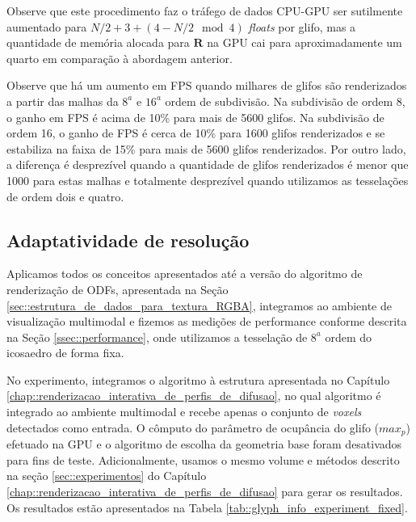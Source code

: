 \documentclass[
    12pt,                %
    oneside,            %
    a4paper,            %
    english,            %
    french,                %
    spanish,            %
    brazil                %
    ]{abntex2}
\begin{document}
Observe que este procedimento faz o tráfego de dados CPU-GPU ser sutilmente aumentado para $N/2 + 3 + (4 -N/2 \mod{4})$ \textit{floats} por glifo, mas a quantidade de memória alocada para $\mathbf{R}$ na GPU cai para aproximadamente um quarto em comparação à abordagem anterior.

Observe que há um aumento em FPS quando milhares de glifos são renderizados a partir das malhas da $8^a$ e $16^a$ ordem de subdivisão. Na subdivisão de ordem 8, o ganho em FPS é acima de 10\% para mais de 5600 glifos. Na subdivisão de ordem 16, o ganho de FPS é cerca de 10\% para 1600 glifos renderizados e se estabiliza na faixa de 15\% para mais de 5600 glifos renderizados. Por outro lado, a diferença é desprezível quando a quantidade de glifos renderizados é menor que 1000 para estas malhas e totalmente desprezível quando utilizamos as tesselações de ordem dois e quatro.




\subsection{Adaptatividade de resolução}
\label{sec::adaptatividade_de_resolucao}

Aplicamos todos os conceitos apresentados até a versão do algoritmo de renderização de ODFs, apresentada na Seção \ref{sec::estrutura_de_dados_para_textura_RGBA}, integramos ao ambiente de visualização multimodal e fizemos as medições de performance conforme descrita na Seção \ref{ssec::performance}, onde utilizamos a tesselação de $8^a$ ordem do icosaedro de forma fixa.

No experimento, integramos o algoritmo à estrutura apresentada no Capítulo \ref{chap::renderizacao_interativa_de_perfis_de_difusao}, no qual algoritmo é integrado ao ambiente multimodal e recebe apenas o conjunto de \textit{voxels} detectados como entrada. O cômputo do parâmetro de ocupância do glifo ($max_p$) efetuado na GPU e o algoritmo de escolha da geometria base foram desativados para fins de teste. Adicionalmente, usamos o mesmo volume e métodos descrito na seção \ref{sec::experimentos} do Capítulo \ref{chap::renderizacao_interativa_de_perfis_de_difusao} para gerar os resultados. Os resultados estão apresentados na Tabela \ref{tab::glyph_info_experiment_fixed}.
\end{document}
